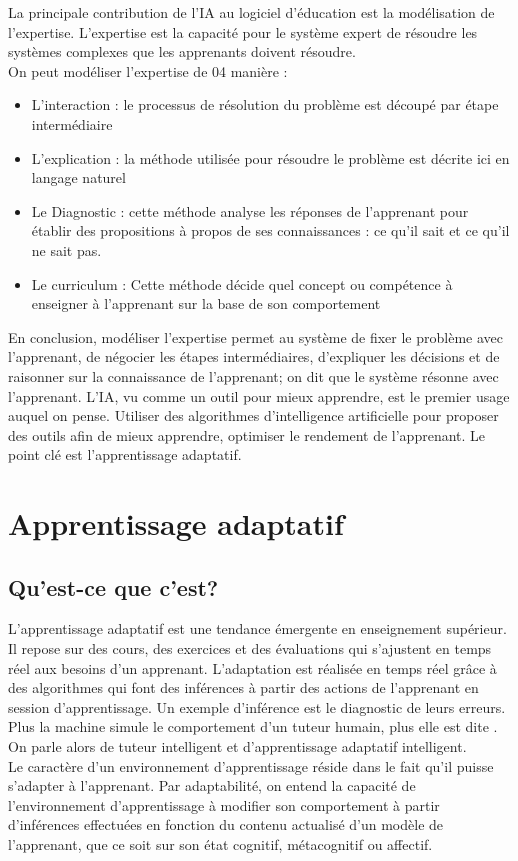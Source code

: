 \noindent

La principale contribution de l’IA au logiciel d’éducation est la modélisation de l’expertise. L’expertise est la capacité pour le système expert de résoudre les systèmes complexes que les apprenants doivent résoudre. \\
On peut modéliser l’expertise de 04 manière :
	\begin{itemize}
		\item L’interaction : le processus de résolution du problème est découpé par étape intermédiaire 
		\item L’explication : la méthode utilisée pour résoudre le problème est décrite ici en langage naturel
		\item Le Diagnostic : cette méthode analyse les réponses de l’apprenant pour établir des propositions à propos de ses connaissances : ce qu’il sait et ce qu’il ne sait pas.
		\item Le curriculum : Cette méthode décide quel concept ou compétence à enseigner à l’apprenant sur la base de son comportement 
	\end{itemize}
	
	En conclusion, modéliser l’expertise permet au système de fixer le problème avec l’apprenant, de négocier les étapes intermédiaires, d’expliquer les décisions et de raisonner sur la connaissance de l’apprenant; on dit que le système résonne avec l’apprenant. L’IA, vu comme un outil pour mieux apprendre, est le premier usage  auquel on pense. Utiliser des algorithmes d’intelligence artificielle pour proposer des outils afin de mieux apprendre, optimiser le rendement de l’apprenant. Le point clé est l’apprentissage adaptatif.
 


\section{Apprentissage adaptatif}

\subsection{Qu’est-ce que c’est?}


L’apprentissage adaptatif est une tendance émergente en enseignement supérieur. Il repose sur des cours, des exercices et des évaluations  qui s’ajustent en temps réel aux besoins d’un apprenant. L’adaptation est réalisée en temps réel grâce à des algorithmes qui font des inférences à partir des actions de l’apprenant en session d’apprentissage. Un exemple d’inférence est le diagnostic de leurs erreurs. Plus la machine simule le comportement d’un tuteur humain, plus elle est dite . On parle alors de tuteur intelligent et d’apprentissage adaptatif intelligent.\\ Le caractère  d’un environnement d’apprentissage réside dans le fait qu’il puisse s’adapter à l’apprenant. Par adaptabilité, on entend la capacité de l’environnement d’apprentissage à modifier son comportement à partir d’inférences effectuées en fonction du contenu actualisé d’un modèle de l’apprenant, que ce soit sur son état cognitif, métacognitif ou affectif. 

